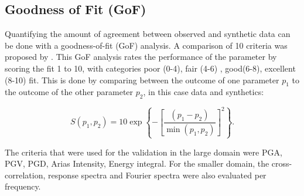 \documentclass[../Text/00main.tex]{subfiles}
\begin{document}
\subsection{Goodness of Fit (GoF)}

Quantifying the amount of agreement between observed and synthetic data can be done with a goodness-of-fit (GoF) analysis. A comparison of 10 criteria was proposed by \cite{anderson_quantitative_nodate}. This GoF analysis rates the performance of the parameter by scoring the fit 1 to 10, with categories poor (0-4), fair (4-6) , good(6-8), excellent (8-10) fit. This is done by comparing between the outcome of one parameter $p_1$ to the outcome of the other parameter $p_2$, in this case data and synthetics:

\begin{equation}
S\left(p_{1}, p_{2}\right)=10 \exp \left\{-\left[\frac{\left(p_{1}-p_{2}\right)}{\min \left(p_{1}, p_{2}\right)}\right]^{2}\right\}.
\end{equation}

The criteria that were used for the validation in the large domain were PGA, PGV, PGD, Arias Intensity, Energy integral. For the smaller domain, the cross-correlation, response spectra and Fourier spectra were also evaluated per frequency. 
\end{document}
